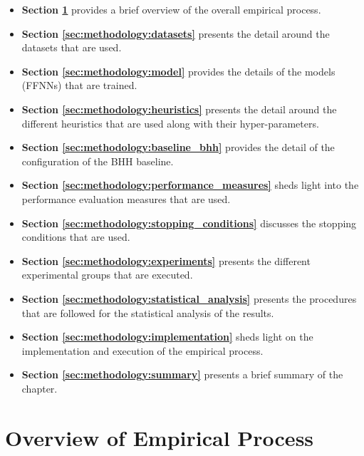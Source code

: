 \begin{itemize}
      \item \textbf{Section \ref{sec:methodology:overview}} provides a brief overview of the overall empirical process.

      \item \textbf{Section \ref{sec:methodology:datasets}} presents the detail around the datasets that are used.

      \item \textbf{Section \ref{sec:methodology:model}} provides the details of the models (\acs{FFNN}s) that are trained.

      \item \textbf{Section \ref{sec:methodology:heuristics}} presents the detail around the different heuristics that are used along with their hyper-parameters.

      \item \textbf{Section \ref{sec:methodology:baseline_bhh}} provides the detail of the configuration of the \acs{BHH} baseline.

      \item \textbf{Section \ref{sec:methodology:performance_measures}} sheds light into the performance evaluation measures that are used.

      \item \textbf{Section \ref{sec:methodology:stopping_conditions}} discusses the stopping conditions that are used.

      \item \textbf{Section \ref{sec:methodology:experiments}} presents the different experimental groups that are executed.

      \item \textbf{Section \ref{sec:methodology:statistical_analysis}} presents the procedures that are followed for the statistical analysis of the results.

      \item \textbf{Section \ref{sec:methodology:implementation}} sheds light on the implementation and execution of the empirical process.

      \item \textbf{Section \ref{sec:methodology:summary}} presents a brief summary of the chapter.
\end{itemize}

\section{Overview of Empirical Process}\label{sec:methodology:overview}


